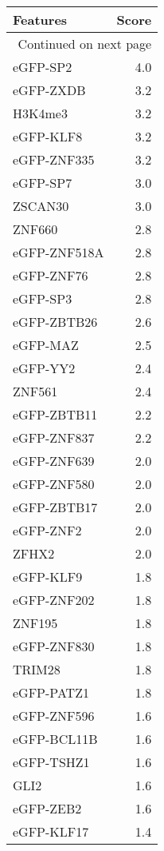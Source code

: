 \begin{longtable}{lr}
\caption{}\\
\toprule
     Features &  Score \\
\midrule
\endhead
\midrule
\multicolumn{2}{r}{{Continued on next page}} \\
\midrule
\endfoot

\bottomrule
\endlastfoot
     eGFP-SP2 &    4.0 \\
    eGFP-ZXDB &    3.2 \\
      H3K4me3 &    3.2 \\
    eGFP-KLF8 &    3.2 \\
  eGFP-ZNF335 &    3.2 \\
     eGFP-SP7 &    3.0 \\
      ZSCAN30 &    3.0 \\
       ZNF660 &    2.8 \\
 eGFP-ZNF518A &    2.8 \\
   eGFP-ZNF76 &    2.8 \\
     eGFP-SP3 &    2.8 \\
  eGFP-ZBTB26 &    2.6 \\
     eGFP-MAZ &    2.5 \\
     eGFP-YY2 &    2.4 \\
       ZNF561 &    2.4 \\
  eGFP-ZBTB11 &    2.2 \\
  eGFP-ZNF837 &    2.2 \\
  eGFP-ZNF639 &    2.0 \\
  eGFP-ZNF580 &    2.0 \\
  eGFP-ZBTB17 &    2.0 \\
    eGFP-ZNF2 &    2.0 \\
        ZFHX2 &    2.0 \\
    eGFP-KLF9 &    1.8 \\
  eGFP-ZNF202 &    1.8 \\
       ZNF195 &    1.8 \\
  eGFP-ZNF830 &    1.8 \\
       TRIM28 &    1.8 \\
   eGFP-PATZ1 &    1.8 \\
  eGFP-ZNF596 &    1.6 \\
  eGFP-BCL11B &    1.6 \\
   eGFP-TSHZ1 &    1.6 \\
         GLI2 &    1.6 \\
    eGFP-ZEB2 &    1.6 \\
   eGFP-KLF17 &    1.4 \\

\end{longtable}
